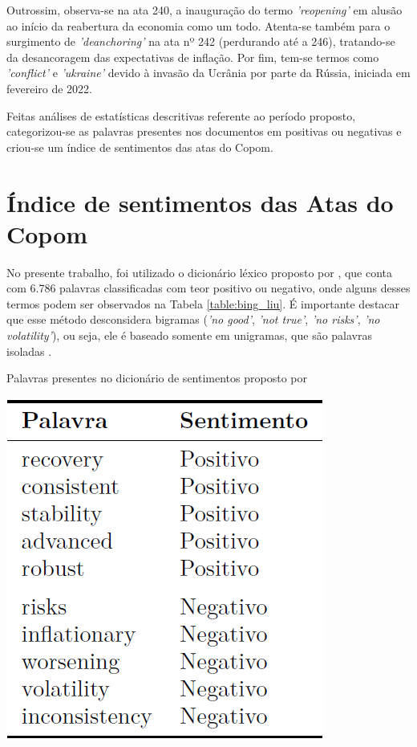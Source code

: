 Outrossim, observa-se na ata 240, a inauguração do termo \textit{'reopening'} em alusão ao início da reabertura da economia como um todo. Atenta-se também para o surgimento de \textit{'deanchoring'} na ata nº 242 (perdurando até a 246), tratando-se da desancoragem das expectativas de inflação. Por fim, tem-se termos como \textit{'conflict'} e \textit{'ukraine'} devido à invasão da Ucrânia por parte da Rússia, iniciada em fevereiro de 2022.

Feitas análises de estatísticas descritivas referente ao período proposto, categorizou-se as palavras presentes nos documentos em positivas ou negativas e criou-se um índice de sentimentos das atas do Copom.

\section{Índice de sentimentos das Atas do Copom} \label{section:indice_sentimentos}

No presente trabalho, foi utilizado o dicionário léxico proposto por , que conta com 6.786 palavras classificadas com teor positivo ou negativo, onde alguns desses termos podem ser observados na Tabela \ref{table:bing_liu}. É importante destacar que esse método desconsidera bigramas (\textit{'no good'}, \textit{'not true'}, \textit{'no risks'}, \textit{'no volatility'}), ou seja, ele é baseado somente em unigramas, que são palavras isoladas \cite{silge2017text}.

\begin{table}[hbtp]
	\centering
	\caption{Palavras presentes no dicionário de sentimentos proposto por } \label{table:bing_liu}
	\includegraphics[scale = 0.50]{figuras/palavras_hu_liu2004.PNG}
\end{table}

